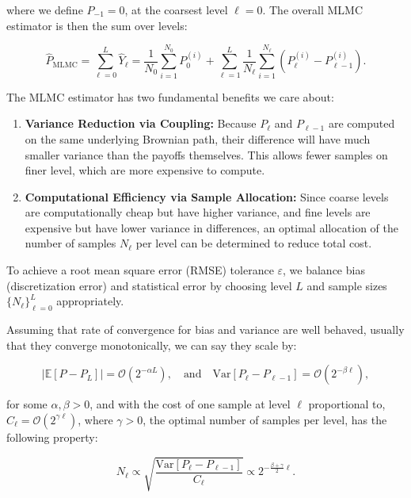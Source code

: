 \documentclass[titlepage]{article}
\begin{document}
where we define \(P_{-1} = 0\), at the coarsest level \(\ell=0\). The overall MLMC estimator is then the sum over levels:

\begin{equation}
\hat{P}_{\text{MLMC}} = \sum_{\ell=0}^L \hat{Y}_\ell = \frac{1}{N_0} \sum_{i=1}^{N_0} P_0^{(i)} + \sum_{\ell=1}^L \frac{1}{N_\ell} \sum_{i=1}^{N_\ell} \left(P_\ell^{(i)} - P_{\ell-1}^{(i)}\right).
\label{eq:mlmc_total_estimator}
\end{equation}

The MLMC estimator has two fundamental benefits we care about:

\begin{enumerate}
    \item \textbf{Variance Reduction via Coupling:} Because \(P_\ell\) and \(P_{\ell-1}\) are computed on the same underlying Brownian path, their difference will have much smaller variance than the payoffs themselves. This allows fewer samples on finer level, which are more expensive to compute.
    
    \item \textbf{Computational Efficiency via Sample Allocation:} Since coarse levels are computationally cheap but have higher variance, and fine levels are expensive but have lower variance in differences, an optimal allocation of the number of samples \(N_\ell\) per level can be determined to reduce total cost.
\end{enumerate}

To achieve a root mean square error (RMSE) tolerance \(\varepsilon\), we balance bias (discretization error) and statistical error by choosing level \(L\) and sample sizes \(\{N_\ell\}_{\ell=0}^L\) appropriately. 

Assuming that rate of convergence for bias and variance are well behaved, usually that they converge monotonically, we can say they scale by:

\[
|\mathbb{E}[P - P_L]| = \mathcal{O}(2^{-\alpha L}), \quad \text{and} \quad \mathrm{Var}[P_\ell - P_{\ell-1}] = \mathcal{O}(2^{-\beta \ell}),
\]

for some \(\alpha, \beta > 0\), and with the cost of one sample at level \(\ell\) proportional to, \(C_\ell = \mathcal{O}(2^{\gamma \ell})\), where \(\gamma > 0\), the optimal number of samples per level, has the following property:

\begin{equation}
N_\ell \propto \sqrt{\frac{\mathrm{Var}[P_\ell - P_{\ell-1}]}{C_\ell}} \propto 2^{-\frac{\beta + \gamma}{2} \ell}.
\label{eq:optimal_sample_allocation}
\end{equation}
\end{document}
